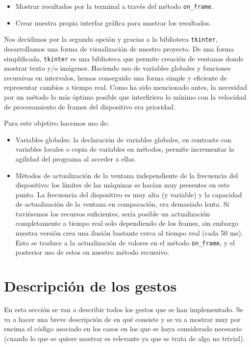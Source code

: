\documentclass[11pt,a4paper]{article}
\begin{document}
\begin{itemize}[label=\textbullet]
	\item Mostrar resultados por la terminal a través del método \texttt{on\_frame}.
	\item Crear nuestra propia interfaz gráfica para mostrar los resultados.
\end{itemize}

Nos decidimos por la segunda opción y gracias a la biblioteca \texttt{tkinter}, desarrollamos una forma de visualización de nuestro proyecto.
De una forma simplificada, \texttt{tkinter} es una biblioteca que permite creación de ventanas donde mostrar texto y/o imágenes. Haciendo uso de variables globales y funciones recursivas en intervalos, hemos conseguido una forma simple y eficiente de representar cambios a tiempo real.
Como ha sido mencionado antes, la necesidad por un método lo más óptimo posible que interfiriera lo mínimo con la velocidad de procesamiento de frames del dispositivo era prioridad. 

Para este objetivo hacemos uso de:

\begin{itemize}[label=\textbullet]
	\item Variables globales: la declaración de variables globales, en contraste con variables locales o copia de variables en métodos, permite incrementar la agilidad del programa al acceder a ellas.
	\item Métodos de actualización de la ventana independiente de la frecuencia del dispositivo: los límites de las máquinas se hacían muy presentes en este punto. La frecuencia del dispositivo es muy alta (y variable) y la capacidad de actualización de la ventana en comparación, era demasiado lenta. Si tuviésemos los recursos suficientes, sería posible un actualización completamente a tiempo real solo dependiendo de los frames, sin embargo nuestra versión crea una ilusión bastante cerca al tiempo real (cada 50 ms). Esto se traduce a la actualización de valores en el método \texttt{on\_frame}, y el posterior uso de estos en nuestro método recursivo.
\end{itemize}

\section{Descripción de los gestos}

En esta sección se van a describir todos los gestos que se han implementado. Se va
a hacer una breve descripción de en qué consiste y se va a mostrar muy por encima
el código asociado en los casos en los que se haya considerado necesario (cuando
lo que se quiere mostrar es relevante ya que se trata de algo no trivial).
\end{document}
